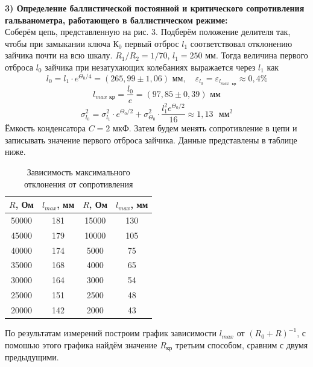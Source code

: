 \documentclass[a4paper,12pt]{article}
\begin{document}
\textbf{3) Определение баллистической постоянной и критического сопротивления гальванометра, работающего в баллистическом режиме:} \\
Соберём цепь, представленную на рис. 3. Подберём положение делителя так, чтобы при замыкании ключа $К_0$ первый отброс $l_{1}$ соответствовал отклонению зайчика почти на всю шкалу. $R_1 / R_2 = 1 / 70$, $l_{1} = 250$ мм. Тогда величина первого отброса $l_0$ зайчика при незатухающих колебаниях выражается через $l_1$ как 
\[l_0 = l_1 \cdot e^{\Theta_0 / 4} = (265,99 \pm 1,06) \text{ мм}, \quad \varepsilon_{l_0} = \varepsilon_{l_{max \text{ } кр}} \approx 0,4 \%\]
\[l_{max \text{ кр}} = \frac{l_0}{e} = (97,85 \pm 0,39)\text{ мм}\]
\[\sigma_{l_0}^2 = \sigma_{l_1}^2 \cdot e^{\Theta_0 / 2} + \sigma_{\Theta_0}^2 \cdot \frac{l_1^2 e^{\Theta_0 / 2}}{16} \approx 1,13 \text{ } мм^2\]
Ёмкость конденсатора $C = 2$ мкФ. Затем будем менять сопротивление в цепи и записывать значение первого отброса зайчика. Данные представлены в таблице ниже.

\begin{table}[H]\label{tab: DataBallsitRejim}
    \centering
    \begin{tabular}{|c|c|c|c|}
        \hline
        {\color[HTML]{000000} $R$, Ом} & {\color[HTML]{000000} $l_{max}$, мм} & {\color[HTML]{000000} $R$, Ом} & {\color[HTML]{000000} $l_{max}$, мм} \\ \hline
        {\color[HTML]{000000} 50000} & {\color[HTML]{000000} 181} & {\color[HTML]{000000} 15000} & {\color[HTML]{000000} 130} \\ \hline
        {\color[HTML]{000000} 45000} & {\color[HTML]{000000} 179} & {\color[HTML]{000000} 10000} & {\color[HTML]{000000} 105} \\ \hline
        {\color[HTML]{000000} 40000} & {\color[HTML]{000000} 174} & {\color[HTML]{000000} 5000}  & {\color[HTML]{000000} 75}  \\ \hline
        {\color[HTML]{000000} 35000} & {\color[HTML]{000000} 168} & {\color[HTML]{000000} 4000}  & {\color[HTML]{000000} 65}  \\ \hline
        {\color[HTML]{000000} 30000} & {\color[HTML]{000000} 164} & {\color[HTML]{000000} 3000}  & {\color[HTML]{000000} 54}  \\ \hline
        {\color[HTML]{000000} 25000} & {\color[HTML]{000000} 151} & {\color[HTML]{000000} 2500}  & {\color[HTML]{000000} 48}  \\ \hline
        {\color[HTML]{000000} 20000} & {\color[HTML]{000000} 142} & {\color[HTML]{000000} 2000}  & {\color[HTML]{000000} 43}  \\ \hline
    \end{tabular}
    \caption{Зависимость максимального отклонения от сопротивления}
\end{table}
По результатам измерений построим график зависимости $l_{max}$ от $(R_0 + R)^{-1}$, с помошью этого графика найдём значение $R_{кр}$ третьим способом, сравним с двумя предыдущими.
\end{document}

